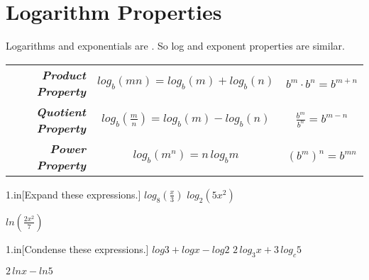 \section{Logarithm Properties}

Logarithms and exponentials are .
So
log and exponent properties are similar.

\begin{myCenteredBox}[width=6.25in]
    \centering\large
    \renewcommand{\arraystretch}{1.5}
    \begin{tabular}{r|c|c}
        {\bfseries\itshape Product Property}
            & $ log_b\left(mn\right) = log_b(m) + log_b(n) $
            & $ b^m \cdot b^n = b^{m+n} $
            \\
        {\bfseries\itshape Quotient Property}
            & $ log_b\left(\frac{m}{n}\right) = log_b(m) - log_b(n) $
            & $ \frac{b^m}{b^n} = b^{m-n} $
            \\
        {\bfseries\itshape Power Property}
            & $ log_b\left(m^n\right) = n \, log_b{m} $
            & $ \left(b^m\right)^n = b^{mn} $ 
            \\
    \end{tabular}
\end{myCenteredBox}



\begin{my2Problems}{1.in}[Expand these expressions.]
    {
        $  log_8\left( \frac{x}{3} \right)  $
    }
    {
        $  log_2\left( 5x^2 \right)  $
    }
\end{my2Problems}
\begin{myProblem}{1.in}
    {
        $  ln\left(\frac{2x^2}{7}\right)$
    }
\end{myProblem}






\begin{my2Problems}{1.in}[Condense these expressions.]
    {
        $  log{3} + log{x} - log{2}  $
    }
    {
        $  2 \, log_3{x} + 3 \, log_c{5}  $
    }
\end{my2Problems}
\begin{myProblem}{1.in}
    {
        $  2 \, ln{x} - ln{5} $
    }
\end{myProblem}
